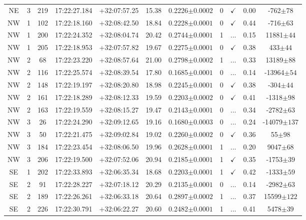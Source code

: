 \begin{landscape}
\begin{longtable}{ccccccccccc}
	NE & 3 & 219 & 17:22:27.184 & +32:07:57.25 & 15.38 & 0.2226$\pm{0.0002}$ & 0 & $\checkmark$ & 0.00 & -762$\pm{78}$ \\
	NW & 1 & 102 & 17:22:18.160 & +32:08:42.50 & 18.84 & 0.2228$\pm{0.0001}$ & 0 & $\checkmark$ & 0.44 & -716$\pm{63}$ \\
	NW & 1 & 200 & 17:22:24.352 & +32:08:04.74 & 20.42 & 0.2744$\pm{0.0001}$ & 1 & ... & 0.15 & 11881$\pm{44}$ \\
	NW & 1 & 205 & 17:22:18.953 & +32:07:57.82 & 19.67 & 0.2275$\pm{0.0001}$ & 0 & $\checkmark$ & 0.38 & 433$\pm{44}$ \\
	NW & 2 & 68 & 17:22:23.220 & +32:08:57.64 & 21.00 & 0.2798$\pm{0.0002}$ & 1 & ... & 0.33 & 13189$\pm{88}$ \\
	NW & 2 & 116 & 17:22:25.574 & +32:08:39.54 & 17.80 & 0.1685$\pm{0.0001}$ & 0 & ... & 0.14 & -13964$\pm{54}$ \\
	NW & 2 & 148 & 17:22:19.197 & +32:08:20.80 & 18.98 & 0.2245$\pm{0.0001}$ & 0 & $\checkmark$ & 0.38 & -304$\pm{44}$ \\
	NW & 2 & 161 & 17:22:18.289 & +32:08:12.33 & 19.59 & 0.2203$\pm{0.0002}$ & 0 & $\checkmark$ & 0.41 & -1318$\pm{98}$ \\
	NW & 2 & 163 & 17:22:19.559 & +32:08:15.27 & 19.47 & 0.2143$\pm{0.0001}$ & 0 & ... & 0.34 & -2782$\pm{63}$ \\
	NW & 3 & 26 & 17:22:24.290 & +32:09:12.65 & 19.16 & 0.1680$\pm{0.0003}$ & 0 & ... & 0.24 & -14079$\pm{137}$ \\
	NW & 3 & 50 & 17:22:21.475 & +32:09:02.84 & 19.02 & 0.2260$\pm{0.0002}$ & 0 & $\checkmark$ & 0.36 & 55$\pm{98}$ \\
	NW & 3 & 184 & 17:22:23.454 & +32:08:06.50 & 19.96 & 0.2628$\pm{0.0001}$ & 1 & ... & 0.20 & 9047$\pm{68}$ \\
	NW & 3 & 206 & 17:22:19.500 & +32:07:52.06 & 20.94 & 0.2185$\pm{0.0001}$ & 1 & $\checkmark$ & 0.35 & -1753$\pm{39}$ \\
	SE & 1 & 202 & 17:22:33.893 & +32:06:35.34 & 18.68 & 0.2203$\pm{0.0001}$ & 1 & $\checkmark$ & 0.42 & -1333$\pm{59}$ \\
	SE & 2 & 91 & 17:22:28.227 & +32:07:18.12 & 20.29 & 0.2135$\pm{0.0001}$ & 0 & ... & 0.14 & -2982$\pm{63}$ \\
	SE & 2 & 189 & 17:22:26.261 & +32:06:33.18 & 20.64 & 0.2897$\pm{0.0002}$ & 1 & ... & 0.37 & 15599$\pm{122}$ \\
	SE & 2 & 226 & 17:22:30.791 & +32:06:22.27 & 20.60 & 0.2482$\pm{0.0001}$ & 1 & ... & 0.41 & 5478$\pm{39}$ \\

\end{longtable}
\end{landscape}
